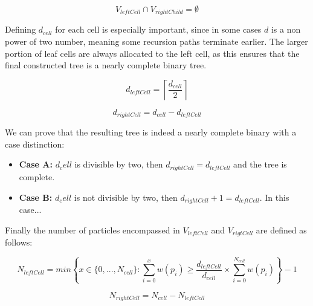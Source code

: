 \documentclass[]{article}
\begin{document}
\begin{center}
	\begin{equation}\label{eq:v2}
		V_{leftCell} \cap V_{rightChild} = \emptyset
	\end{equation}
\end{center}

Defining $d_{cell}$ for each cell is especially important, since in some cases $d$ is a non power of two number, meaning some recursion paths terminate earlier. The larger portion of leaf cells are always allocated to the left cell, as this ensures that the final constructed tree is a nearly complete binary tree. 

\begin{center}
	\begin{equation} \label{eq:d1}
		d_{leftCell} = \left \lceil\frac{d_{cell}}{2} \right \rceil 
	\end{equation}
\end{center}

\begin{center}
	\begin{equation}  \label{eq:d2}
		d_{rightCell} = d_{cell} - d_{leftCell}
	\end{equation}
\end{center}

We can prove that the resulting tree is indeed a nearly complete binary with a case distinction:

\begin{itemize}
	\item \textbf{Case A:} $d_cell$ is divisible by two, then $	d_{rightCell} = d_{leftCell}$ and the tree is complete. 
	\item \textbf{Case B:} $d_cell$ is not divisible by two, then $	d_{rightCell} + 1 = d_{leftCell}$. In this case... 
\end{itemize}


Finally the number of particles encompassed in $V_{leftCell}$ and $V_{rigtCell}$ are defined as follows:

\begin{center}
	\begin{equation}\label{eq:N1}
		N_{leftCell} = min \left \{ x \in \{0,...,N_{cell} \} : \sum_{i=0}^{x} w(p_i) \geq \frac{d_{leftCell}}{d_{cell}} \times \sum_{i=0}^{N_{cell}} w(p_i) \right \} - 1
	\end{equation}
\end{center}

\begin{center}
	\begin{equation}\label{eq:N2}
		N_{rightCell} = N_{cell} - N_{leftCell}
	\end{equation}
\end{center}
\end{document}
